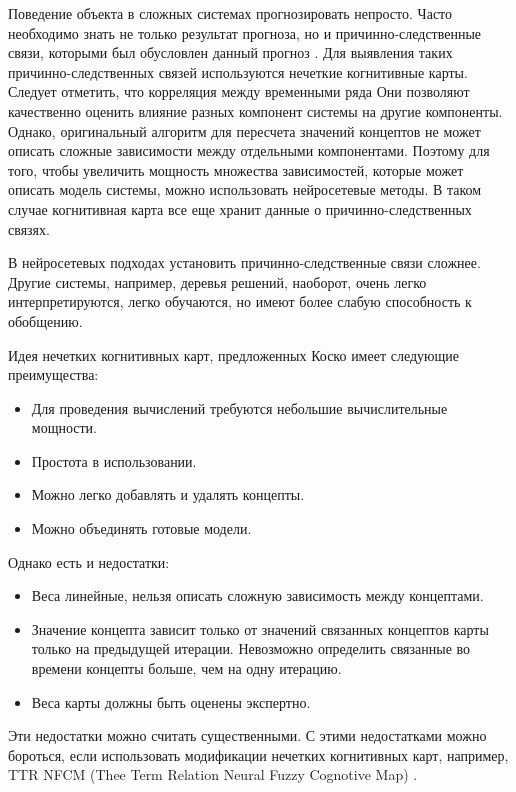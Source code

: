 Поведение объекта в сложных системах прогнозировать непросто.
Часто необходимо знать не только результат прогноза,
но и причинно-следственные связи, которыми был обусловлен данный прогноз
\cite{osoba2019dags} \cite{efficient_fcms}.
Для выявления таких причинно-следственных связей используются нечеткие когнитивные карты.
Следует отметить, что корреляция между временными ряда
Они позволяют качественно оценить влияние разных компонент системы на другие компоненты.
Однако, оригинальный алгоритм для пересчета значений концептов
не может описать сложные зависимости между отдельными компонентами.
Поэтому для того, чтобы увеличить мощность множества зависимостей, которые
может описать модель системы, можно использовать нейросетевые методы.
В таком случае когнитивная карта все еще хранит данные о причинно-следственных связях.

В нейросетевых подходах установить причинно-следственные связи сложнее.
Другие системы, например, деревья решений, наоборот, очень легко интерпретируются, легко обучаются,
но имеют более слабую способность к обобщению.

Идея нечетких когнитивных карт, предложенных Коско \cite{kosko1986fuzzy} имеет следующие преимущества:

\begin{itemize}
	\item Для проведения вычислений требуются небольшие вычислительные мощности.
	\item Простота в использовании.
	\item Можно легко добавлять и удалять концепты.
	\item Можно объединять готовые модели.
\end{itemize}

Однако есть и недостатки:

\begin{itemize}
	\item Веса линейные, нельзя описать сложную зависимость между концептами.
	\item Значение концепта зависит только от значений связанных концептов карты только на предыдущей итерации.
	Невозможно определить связанные во времени концепты больше, чем на одну итерацию.
	\item Веса карты должны быть оценены экспертно.
\end{itemize}

Эти недостатки можно считать существенными.
С этими недостатками можно бороться, если использовать модификации нечетких когнитивных карт,
например, TTR NFCM (Thee Term Relation Neural Fuzzy Cognotive Map) \cite{threeTermNfcm}.

